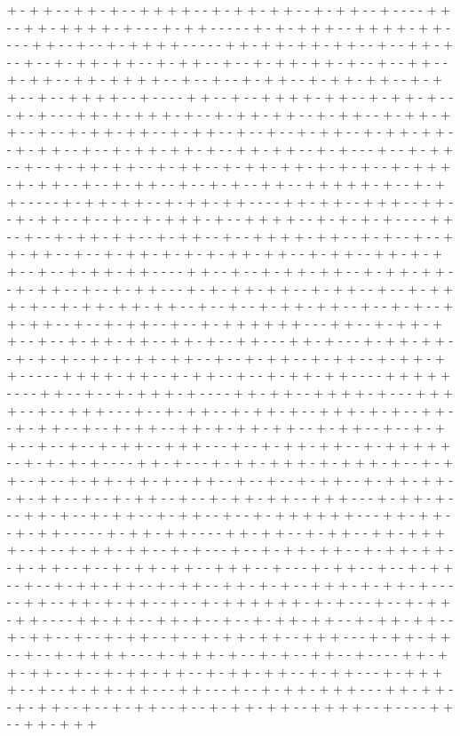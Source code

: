 + - + + - - + + - + - - + + + + - - + - + + - + + - - + - + + - - + - - - - + + - - + + - + + + + - + - - - + - + + - - - - - + - + - + + + - - + + + + - + + - - - - + + - - + - - + - + + + + - - - - - + + - + + - + + - + + - - + - - + + - + - - + - - + - + + - + + - - + - + + - - + - - + - + + - + + - + - - + - - + + - - + - + + - - + + - + + + + - - + - - + - - + - + + - - + - + + - + + - - + - + + - - + - - + + + + - - + - - - - + + - - + - - + + + + - + + - - + - + + - + - - - + - + - - - + + - + - + + + - + - - + - + + - + + - - + - + + - - + - + + - + + - - + - - + - + + - + + - - + - + + - - + - - + - - + - + + - - + - + + - + + - - + - + + - - + - - + - + + - + + - + - - + + - + + - - + - + - - - + - - + - + + - - + - - + - + + - + + - - + - + + - - + - + + - + + - + - + - + - - + - + + + - + - + + - - + - - + - + + - - + - - + - + - - + + - - + + + + + - + - - + - + + - - - - - + - + + - + + - - + - + + - + + - - - - + + - + + - - + + + - - + + - - + - + + - - + - - + - - + - + + + - + - - + + + + - - + - + - + - + - - - - + + - - + - - + - + + - + + - - + - + + - - + - - + + + + - + + - - + - + - - + - - + + - + + - - + - - + - + + - + - + - + - + + - + + - - + - + + - - + + - + - + + - - + - - + - + + - + + - - - - + + - - + - - + - + + - + + - - + - + + - + + - - + - + + - - + - - + - + + - - - + - + - + + - + + - - + - + + - - + - - + - + + + - + - - + - + + - + + - + + - - + - - + - - + - + + - + + - - + - - + - + - - + + - + + - - + - - + - + + - - + - - + - + + + + + + - - - + + - - + - + + - + + - - + - - + - + + - + + - - + + - + - - + + - - - + + - + - - - + - + + - + + - - + - + - + - - + - + - + + - + + - - + - - + - + + - - + - + + - - + - + + - + + - - - - - + + + + - + + - - + - + + - - + - - + - + + - + + - - - - + + + + + - - - - + + - - + - - + - + + + - + - - - - + + - + + - - + + + + - + - - - + + + + - - + - - + + + - - - + - - + - + + - - + - + + - + - - + + + - + - + - - + + - - + - + + - - + - - + - + + - - + + - + - + + - + + - - + - + + - - + - - + - + + - - + - - + - - + - + + - - + + + - - - + - - + - + + - + + - - + - + + + + + - - + - + - + - + - - - - + + - + - - - + - + + - + + + - + - + + + - + - - + - + + - - + - - + - + + - + + - + - - + + - - + - - + - - + - + + - - + - + + - + + - - + - + + - - + - - + - + + - - + - - + - + + - + + - - + + + - - - + - + + - + - - - + + - + - - + - + + - - + - + + - - + - - + - + + + + + + - - - + + - + + - - + - + + - - - - - + - + + - + + - - - - + + - + + - - + - + + - - + + - + + + + - - + - - + - + + - + + - - + - + - - - + - - + - + + - + + - - + - + + - + + - - + - + + - - + - - + - + + - + + - - + + + - - + - - - + - + + - - + - - + - + + - - + - - + - + + - + + - - + - + + - - + + - + - + - - + + + - + - + + - + - - - - - + + - - + + - + - + + - - + - - + - + + + + + + - + - + - - - + - - + - + + - + + - - - - + + - + + - - + + - + - - + - - + - + + - + + - - + - + + - + + - - + - + + - - + - - + - + + - - + - - + - + + - + + - - + + + - - - + - + + - + + - - + - - + - + + + + - - - + - + + + - + - - + - + - - + + - - + - - - - + + - + + - + + - - + - - + - + + - + + - - + - + + - + + - - + - + + - - - + - + + + + - - + - - + - + + - + + - - - + + - - - + - - + - + + - + + + - - - + + - + + - - + - + + - - + - - + - + + - - + - - + - + + - + + - - + + + + - - + - - - - + + - - + + - + + + 